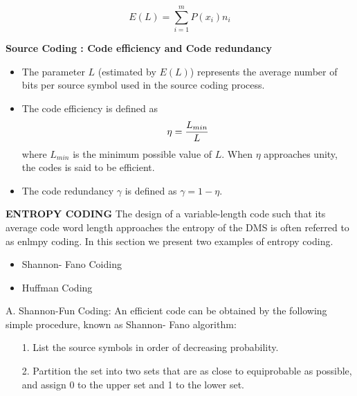 {\begin{itemize}
\[ E(L) = \sum ^{m}_{i=1} P(x_i) n_i \]
\end{itemize}




\noindent \textbf{Source Coding : Code efficiency and Code redundancy}
\begin{itemize}
\item The parameter $L$ (estimated by $E(L)$) represents the average number of bits per source symbol used in the source coding process.\item
The code efficiency is defined as \[\eta = {L_{min} \over L} \]where $L_{min}$ is the minimum possible value of $L$. When $\eta$ approaches unity, the codes is said to be efficient.
\item The code redundancy $\gamma$ is defined as $\gamma = 1- \eta$.
\end{itemize}




\noindent \textbf{ ENTROPY CODING}
The design of a variable-length code such that its average code word length approaches the
entropy of the DMS is often referred to as enlmpy coding. In this section we present two examples of
entropy coding.
\begin{itemize}
\item Shannon- Fano Coiding
\item Huffman Coding
\end{itemize}


{A. Shannon-Fun Coding:}
An efficient code can be obtained by the following simple procedure, known as
Shannon- Fano algorithm:
\begin{itemize}
\item[1.] List the source symbols in order of decreasing probability.
\item[2.] Partition the set into two sets that are as close to equiprobable as possible, and assign 0 to the
upper set and 1 to the lower set.
\end{itemize}




}
